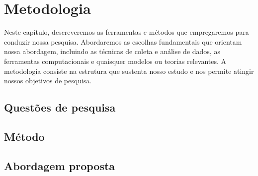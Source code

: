 
\chapter{Metodologia}\label{cap:Metodologia}
Neste capítulo, descreveremos as ferramentas e métodos que empregaremos para conduzir nossa pesquisa. Abordaremos as escolhas fundamentais que orientam nossa abordagem, incluindo as técnicas de coleta e análise de dados, as ferramentas computacionais e quaisquer modelos ou teorias relevantes. A metodologia consiste na estrutura que sustenta nosso estudo e nos permite atingir nossos objetivos de pesquisa.

\section{Questões de pesquisa}


\section{Método}



\section{Abordagem proposta}




